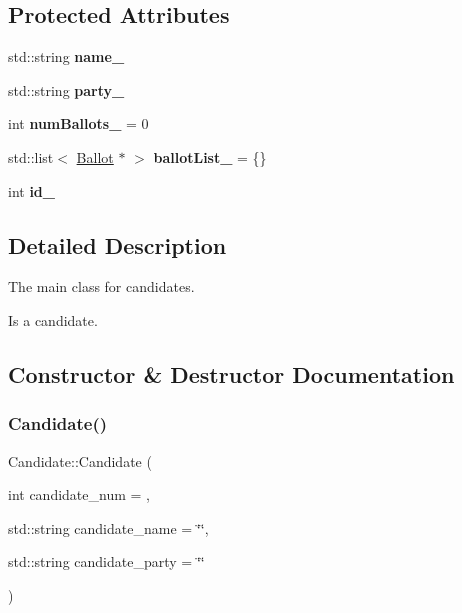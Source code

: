 \subsection*{Protected Attributes}
\begin{DoxyCompactItemize}
\item 
\mbox{\label{classCandidate_a70cca9349b891eb921bfdeabe7ded6d5}} 
std\+::string {\bfseries name\+\_\+}
\item 
\mbox{\label{classCandidate_a0bfc84bce32a43270d2387aea8ce2cdf}} 
std\+::string {\bfseries party\+\_\+}
\item 
\mbox{\label{classCandidate_aec8aa8cbbd790386924e7b57b84c9081}} 
int {\bfseries num\+Ballots\+\_\+} = 0
\item 
\mbox{\label{classCandidate_ab1454bc82abc3f3b417bdf81de09fc0c}} 
std\+::list$<$ \hyperlink{classBallot}{Ballot} $\ast$ $>$ {\bfseries ballot\+List\+\_\+} = \{\}
\item 
\mbox{\label{classCandidate_a04149c9b00ec326c2d81cc607c29271c}} 
int {\bfseries id\+\_\+}
\end{DoxyCompactItemize}


\subsection{Detailed Description}
The main class for candidates. 

Is a candidate. 

\subsection{Constructor \& Destructor Documentation}
\mbox{\label{classCandidate_a5687946f621baf578fe2391272481dc5}} 
\subsubsection{\texorpdfstring{Candidate()}{Candidate()}}
{\footnotesize\ttfamily Candidate\+::\+Candidate (\begin{DoxyParamCaption}\item[{int}]{candidate\+\_\+num = {},  }\item[{std\+::string}]{candidate\+\_\+name = {\ttfamily \char`\"{}\char`\"{}},  }\item[{std\+::string}]{candidate\+\_\+party = {\ttfamily \char`\"{}\char`\"{}} }\end{DoxyParamCaption})\hspace{0.3cm}{\ttfamily [explicit]}}



